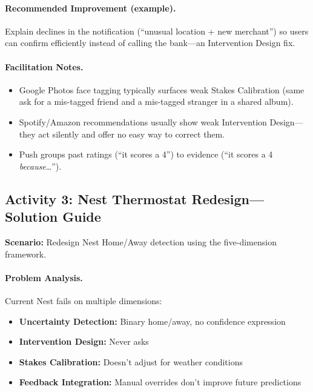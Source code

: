 \paragraph{Recommended Improvement (example).} Explain declines in the
notification (``unusual location + new merchant'') so users can confirm
efficiently instead of calling the bank---an Intervention Design fix.

\paragraph{Facilitation Notes.}
\begin{itemize}
    \item Google Photos face tagging typically surfaces weak Stakes
        Calibration (same ask for a mis-tagged friend and a mis-tagged
        stranger in a shared album).
    \item Spotify/Amazon recommendations usually show weak Intervention
        Design---they act silently and offer no easy way to correct them.
    \item Push groups past ratings (``it scores a 4'') to evidence
        (``it scores a 4 \emph{because}\ldots'').
\end{itemize}

\subsection{Activity 3: Nest Thermostat Redesign---Solution Guide}

\textbf{Scenario:} Redesign Nest Home/Away detection using the five-dimension framework.

\paragraph{Problem Analysis.}

Current Nest fails on multiple dimensions:
\begin{itemize}
    \item \textbf{Uncertainty Detection:} Binary home/away, no confidence expression
    \item \textbf{Intervention Design:} Never asks
    \item \textbf{Stakes Calibration:} Doesn't adjust for weather conditions
    \item \textbf{Feedback Integration:} Manual overrides don't improve future predictions
\end{itemize}

